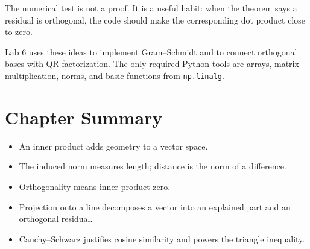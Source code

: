The numerical test is not a proof. It is a useful habit: when the theorem says
a residual is orthogonal, the code should make the corresponding dot product
close to zero.

\begin{labbox}
Lab 6 uses these ideas to implement Gram--Schmidt and to connect orthogonal
bases with QR factorization. The only required Python tools are arrays, matrix
multiplication, norms, and basic functions from \texttt{np.linalg}.
\end{labbox}

\section*{Chapter Summary}

\begin{itemize}
  \item An inner product adds geometry to a vector space.
  \item The induced norm measures length; distance is the norm of a difference.
  \item Orthogonality means inner product zero.
  \item Projection onto a line decomposes a vector into an explained part and
        an orthogonal residual.
  \item Cauchy--Schwarz justifies cosine similarity and powers the triangle
        inequality.
\end{itemize}


